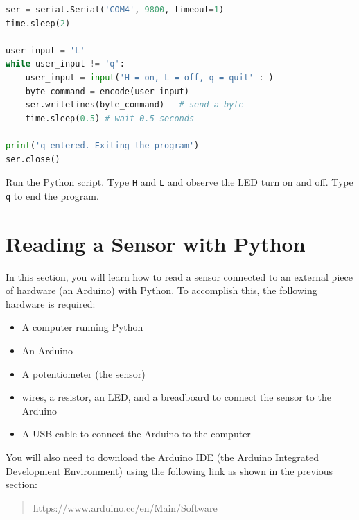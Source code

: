 \documentclass{book}
\providecommand{\tightlist}{%
      \setlength{\itemsep}{0pt}\setlength{\parskip}{0pt}}
\begin{document}
    
        \begin{lstlisting}[language=Python]
ser = serial.Serial('COM4', 9800, timeout=1)
time.sleep(2)

user_input = 'L'
while user_input != 'q':
    user_input = input('H = on, L = off, q = quit' : )
    byte_command = encode(user_input)
    ser.writelines(byte_command)   # send a byte
    time.sleep(0.5) # wait 0.5 seconds
        
print('q entered. Exiting the program')
ser.close()
\end{lstlisting}
    




    
        Run the Python script. Type \lstinline!H! and \lstinline!L! and observe
the LED turn on and off. Type \lstinline!q! to end the program.
    




    
        \section{Reading a Sensor with
Python}\label{reading-a-sensor-with-python}
    




    
        In this section, you will learn how to read a sensor connected to an
external piece of hardware (an Arduino) with Python. To accomplish this,
the following hardware is required:

\begin{itemize}
\tightlist
\item
  A computer running Python
\item
  An Arduino
\item
  A potentiometer (the sensor)
\item
  wires, a resistor, an LED, and a breadboard to connect the sensor to
  the Arduino
\item
  A USB cable to connect the Arduino to the computer
\end{itemize}

You will also need to download the Arduino IDE (the Arduino Integrated
Development Environment) using the following link as shown in the
previous section:

\begin{quote}
https://www.arduino.cc/en/Main/Software
\end{quote}
    
\end{document}
